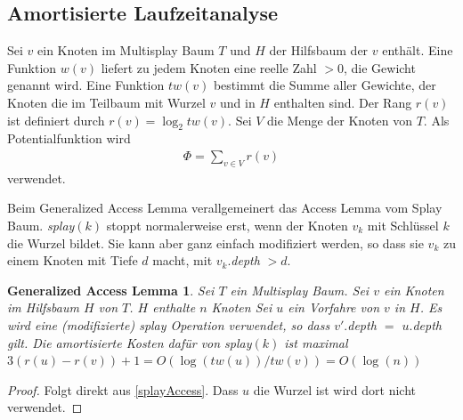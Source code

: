 \documentclass[a4paper,12pt]{article}
\begin{document}
\subsection{Amortisierte Laufzeitanalyse}
Sei $v$ ein Knoten im Multisplay Baum $T$ und $H$ der Hilfsbaum der $v$ enthält. Eine Funktion $w\left(v\right)$ liefert zu jedem Knoten eine reelle Zahl $>0$, die Gewicht genannt wird. Eine Funktion $\mathit{tw}\left(v\right)$ bestimmt die Summe aller Gewichte, der Knoten die im Teilbaum mit Wurzel $v$ und in $H$ enthalten sind. Der Rang  $r\left(v\right)$ ist definiert durch $r\left(v\right) = \log_2  \mathit{tw}\left(v\right)$. Sei $V$ die Menge der Knoten von $T$. Als Potentialfunktion wird 
\begin{align*}
\Phi = \sum_{v \in V} r\left(v\right)
\end{align*}
verwendet.

Beim Generalized Access Lemma verallgemeinert das Access Lemma vom Splay Baum. \textit{splay}$\left(k\right)$ stoppt normalerweise erst, wenn der Knoten $v_k$ mit Schlüssel $k$ die Wurzel bildet. Sie kann aber ganz einfach modifiziert werden, so dass sie $v_k$ zu einem Knoten mit Tiefe $d$ macht, mit $v_k.$\textit{depth} $> d $.

\newtheorem{Lemma1}{Generalized Access Lemma}[section] 
\begin{Lemma1}Sei $T$ ein Multisplay Baum. Sei $v$ ein Knoten im Hilfsbaum $H$ von $T$. $H$ enthalte $n$ Knoten Sei $u$ ein Vorfahre von $v$ in $H$. Es wird eine (modifizierte) \textit{splay} Operation verwendet, so dass $v'.$\textit{depth} $=$ $u.$\textit{depth} gilt.  Die amortisierte Kosten dafür von \textit{splay}$\left(k\right)$ ist maximal $3 \left(r\left(u\right) - r\left(v\right)\right) + 1 = O\left(\log\left(\mathit{tw}\left(u\right)\right)  / \mathit{tw}\left(v\right) \right) = O\left(\log\left(n\right)\right)$ \\	
\end{Lemma1}
\begin{proof}
Folgt direkt aus \ref{splayAccess}. Dass $u$ die Wurzel ist wird dort nicht verwendet. 	
	
\end{proof}
\newtheorem{Lemma2}{Multisplay Baum Access Lemma}[section] \label{lemmaMultiSplay}
\end{document}
